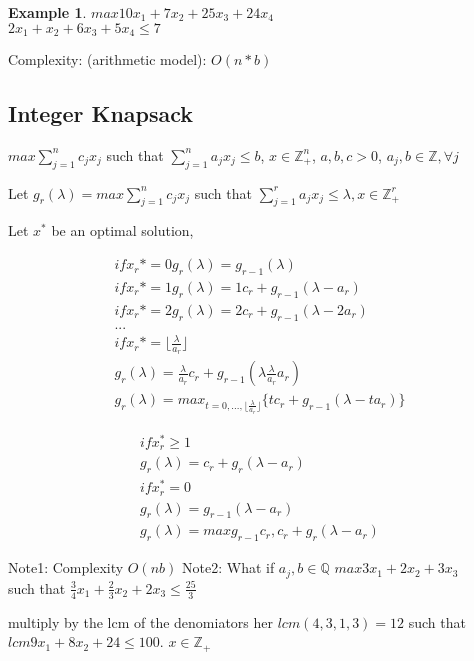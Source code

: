\documentclass{article}
\theoremstyle{plain}
\theoremstyle{definition}
\newtheorem{eg}{Example}
\newcommand{\floor}[1]{\lfloor #1 \rfloor}
\begin{document}
\begin{eg}
    $max 10x_1 + 7x_2 + 25x_3 + 24x_4$\\
    $2x_1 + x_2 + 6x_3 + 5x_4 \leq 7$
\end{eg}

Complexity:
(arithmetic model): $O(n*b)$

\subsection{Integer Knapsack}
$max \sum^n_{j=1} c_jx_j$ such that $\sum^n_{j=1} a_jx_j \leq b$,
$x\in\mathbb{Z}^n_{+}$, $a,b,c > 0$, $a_j, b\in\mathbb{Z},\forall j$

Let $g_r(\lambda) = max \sum^n_{j=1} c_jx_j$ such that
$\sum_{j=1}^r a_j x_j \leq \lambda, x\in\mathbb{Z}^r_+$

Let $x^*$ be an optimal solution,

\begin{align*}
    if x_r* = 0 g_r(\lambda) = g_{r-1}(\lambda)\\
    if x_r* = 1 g_r(\lambda) = 1 c_r + g_{r-1}(\lambda -a_r)\\
    if x_r* = 2 g_r(\lambda) = 2 c_r + g_{r-1}(\lambda -2a_r)\\
    ...\\
    if x_r* = \floor{\frac{\lambda}{a_r}}\\
    g_r(\lambda) = \frac{\lambda}{a_r}c_r + g_{r-1}(\lambda \frac{\lambda}{a_r}a_r)\\
    g_r(\lambda) = max_{t=0,...,\floor{\frac{\lambda}{a_r}}} \{tc_r + g_{r-1}(\lambda-ta_r)\}
\end{align*}

\begin{align*}
    if x_r^* \geq 1\\
    g_r(\lambda) = c_r + g_r(\lambda - a_r)\\
    if x_r^* = 0\\
    g_r(\lambda) = g_{r-1}(\lambda - a_r)\\
    g_r(\lambda) = max{g_{r-1}c_r, c_r + g_r(\lambda - a_r)}
\end{align*}

Note1: Complexity $O(nb)$
Note2: What if $a_j, b\in\mathbb{Q}$
$max 3x_1 + 2x_2 + 3x_3$\\
such that $\frac{3}{4} x_1 + \frac{2}{3}x_2 + 2x_3 \leq \frac{25}{3}$

multiply by the lcm of the denomiators her $lcm(4,3,1,3) = 12$
such that $lcm 9x_1 + 8x_2 + 24 \leq 100$.
$x\in\mathbb{Z_+}$
\end{document}
